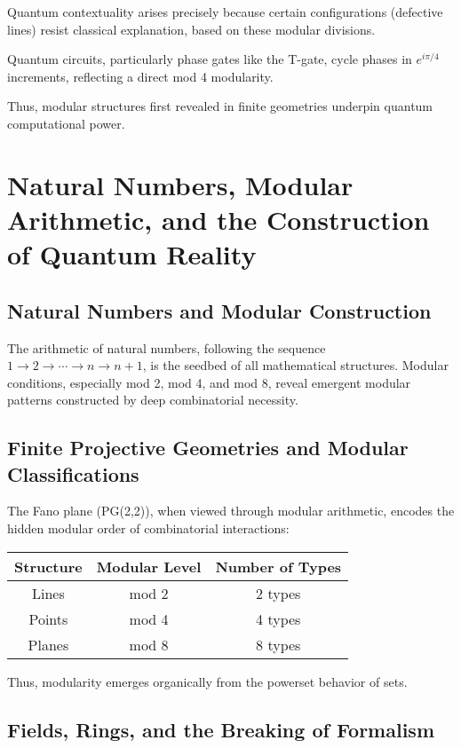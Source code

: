 \documentclass[11pt]{article}
\begin{document}
Quantum contextuality arises precisely because certain configurations (defective lines) resist classical explanation, based on these modular divisions.

Quantum circuits, particularly phase gates like the T-gate, cycle phases in $e^{i\pi/4}$ increments, reflecting a direct mod 4 modularity.

Thus, modular structures first revealed in finite geometries underpin quantum computational power.

\section{Natural Numbers, Modular Arithmetic, and the Construction of Quantum Reality}

\subsection{Natural Numbers and Modular Construction}

The arithmetic of natural numbers, following the sequence $1 \to 2 \to \cdots \to n \to n+1$, is the seedbed of all mathematical structures. Modular conditions, especially mod 2, mod 4, and mod 8, reveal emergent modular patterns constructed by deep combinatorial necessity.

\subsection{Finite Projective Geometries and Modular Classifications}

The Fano plane (PG(2,2)), when viewed through modular arithmetic, encodes the hidden modular order of combinatorial interactions:

\begin{center}
\begin{tabular}{ccc}
\toprule
Structure & Modular Level & Number of Types \\
\midrule
Lines & mod 2 & 2 types \\
Points & mod 4 & 4 types \\
Planes & mod 8 & 8 types \\
\bottomrule
\end{tabular}
\end{center}

Thus, modularity emerges organically from the powerset behavior of sets.

\subsection{Fields, Rings, and the Breaking of Formalism}
\end{document}
